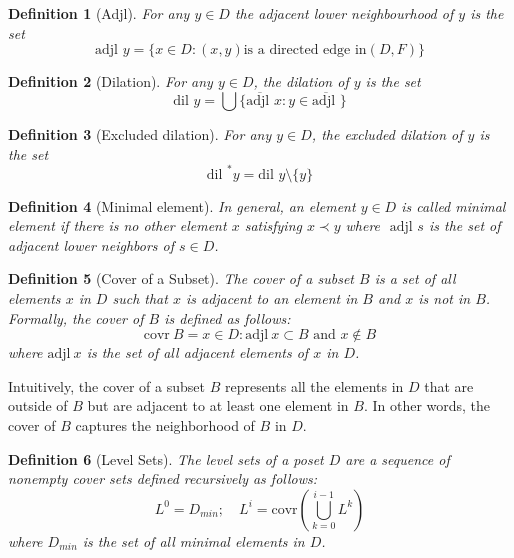 \documentclass[11pt]{amsart}
\newtheorem{definition}{Definition}
\begin{document}
\begin{definition}[Adjl]
For any $y \in D$ the \textit{adjacent lower neighbourhood} of $y$ is the set $$
\text{adjl } y = \{ x \in D:(x,y) \text{is a directed edge in} (D,F)\}
$$
\end{definition}

\begin{definition}[Dilation]
For any $y \in D$, the \textit{dilation} of $y$ is the set 
\begin{equation}
\text{dil } y = \bigcup\{ \overline{\text{adjl }} x : y \in \overline{\text{adjl }} \} \nonumber
\end{equation}
\end{definition}

\begin{definition}[Excluded dilation]
For any $y \in D$, the \textit{excluded dilation}  of $y$ is the set 
\begin{equation}
\text{dil }^* y = \text{dil } y \setminus \{y\}
\end{equation}
\end{definition}

\begin{definition}[Minimal element]
In general, an element $y\in D$ is called \textit{minimal element} if there is no other element $x$ satisfying $x\prec y$ where $\text{ adjl } s$ is the set of adjacent lower neighbors of $s \in D$.
\end{definition}


\begin{definition}[Cover of a Subset]
The cover of a subset $B$ is a set of all elements $x$ in $D$ such that $x$ is adjacent to an element in $B$ and $x$ is not in $B$. Formally, the cover of $B$ is defined as follows:
\begin{equation}
\text{covr}\ B = { x \in D: \text{adjl}\ x \subset B \text{ and } x \notin B } \nonumber
\end{equation}
where $\text{adjl}\ x$ is the set of all adjacent elements of $x$ in $D$.
\end{definition}
Intuitively, the cover of a subset $B$ represents all the elements in $D$ that are outside of $B$ but are adjacent to at least one element in $B$. In other words, the cover of $B$ captures the neighborhood of $B$ in $D$.

\begin{definition}[Level Sets]
The level sets of a poset $D$ are a sequence of nonempty cover sets defined recursively as follows:
\begin{equation}
L^0 = D_{min};\quad L^i = \text{covr}\left( \bigcup_{k=0}^{i-1} L^k \right) \nonumber
\end{equation}
where $D_{min}$ is the set of all minimal elements in $D$.
\end{definition}
\end{document}
